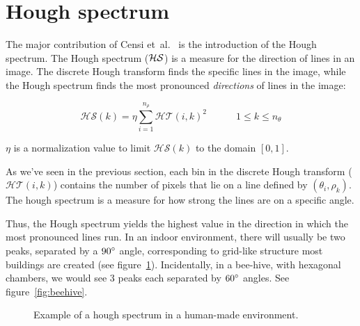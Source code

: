 \section{Hough spectrum}
The major contribution of Censi et~al.\ \cite{censi2005scan} is the introduction of the Hough spectrum. The Hough spectrum ($\cal HS$) is a measure for the direction of lines in an image. The discrete Hough transform finds the specific lines in the image, while the Hough spectrum finds the most pronounced \emph{directions} of lines in the image:

\begin{equation}
\mathcal{HS}(k) = \eta \sum_{i=1}^{n_\rho} \mathcal{HT} (i, k) ^ 2 \qquad \quad 1 \leq k \leq n_\theta
\end{equation}

$\eta$ is a normalization value to limit $\mathcal{HS}(k)$ to the domain $[0, 1]$.

As we've seen in the previous section, each bin in the discrete Hough transform ($\mathcal{HT} (i, k)$) contains the number of pixels that lie on a line defined by $(\theta_i, \rho_k)$. The hough spectrum is a measure for how strong the lines are on a specific angle. 

Thus, the Hough spectrum yields the highest value in the direction in which the most pronounced lines run. In an indoor environment, there will usually be two peaks, separated by a $90\degree$ angle, corresponding to grid-like structure most buildings are created (see figure~\ref{fig:rooms}). Incidentally, in a bee-hive, with hexagonal chambers, we would see 3 peaks each separated by $60\degree$  angles. See figure~\ref{fig:beehive}.

\begin{figure}[ht]
\centering
{}
\caption{Example of a hough spectrum in a human-made environment.}
\label{fig:rooms}
\end{figure}

